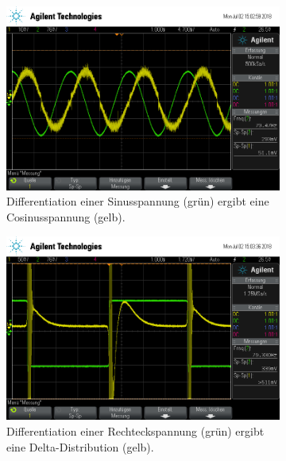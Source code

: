 \begin{figure}[ht]
  \centering
  \begin{subfigure}[]{\textwidth}
    \centering
    \includegraphics[height=0.28\textheight]{data/scope_265.png}
    \caption{Differentiation einer Sinusspannung (grün) ergibt eine Cosinusspannung (gelb).}
    \label{subfig:dif_sinus}
  \end{subfigure}
  \begin{subfigure}[]{\textwidth}
    \centering
    \includegraphics[height=0.28\textheight]{data/scope_266.png}
    \caption{Differentiation einer Rechteckspannung (grün) ergibt eine Delta-Distribution (gelb).}
    \label{subfig:dif_rechteck}
  \end{subfigure}
  \begin{subfigure}[]{\textwidth}
    \centering

\end{subfigure}
\end{figure}
